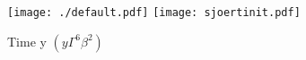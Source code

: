 \documentclass{article}
\begin{document}
\begin{figure}
\begin{center}
\texttt{[image: ./default.pdf]}
\texttt{[image: sjoertinit.pdf]}
\caption{Time y $(y \Gamma^6 \beta^2)$}
\end{center}
\end{figure} 
\end{document}
